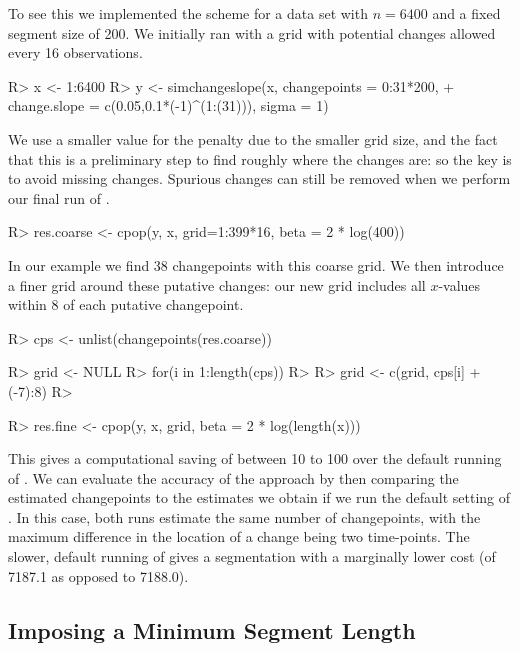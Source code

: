 \documentclass[nojss]{jss}
\begin{document}
To see this we implemented the scheme for a data set with $n=6400$ and a fixed segment size of 200.  We initially ran  with a grid with potential changes allowed every 16 observations.
\begin{CodeChunk}
\begin{CodeInput}
R> x <- 1:6400
R> y <- simchangeslope(x, changepoints = 0:31*200, 
+ change.slope = c(0.05,0.1*(-1)^(1:(31))), sigma = 1)
\end{CodeInput}
\end{CodeChunk}

We use a smaller value for the penalty due to the smaller grid size, and the fact that this is a preliminary step to find roughly where the changes are: so the key is to avoid missing changes. Spurious changes can still be removed when we perform our final run of . 
\begin{CodeChunk}
\begin{CodeInput}
R> res.coarse <- cpop(y, x, grid=1:399*16, beta = 2 * log(400))
\end{CodeInput}
\end{CodeChunk}

In our example we find 38 changepoints with this coarse grid. We then introduce a finer grid around these putative changes: our new grid includes all $x$-values within 8 of each putative changepoint.
\begin{CodeChunk}
\begin{CodeInput}
R> cps <- unlist(changepoints(res.coarse))

R> grid <- NULL
R> for(i in 1:length(cps))
R> {
R>   grid <- c(grid, cps[i] + (-7):8)
R> }

R> res.fine <- cpop(y, x, grid, beta = 2 * log(length(x)))
\end{CodeInput}
\end{CodeChunk}

This gives a computational saving of between 10 to 100 over the default running of . We can evaluate the accuracy of the approach by then comparing the estimated changepoints to the estimates we obtain if we run the default setting of . In this case, both runs estimate the same number of changepoints, with the maximum difference in the location of a change being two time-points. The slower, default running of  gives a segmentation with a marginally lower cost (of 7187.1 as opposed to 7188.0).

\subsection{Imposing a Minimum Segment Length}
\end{document}
